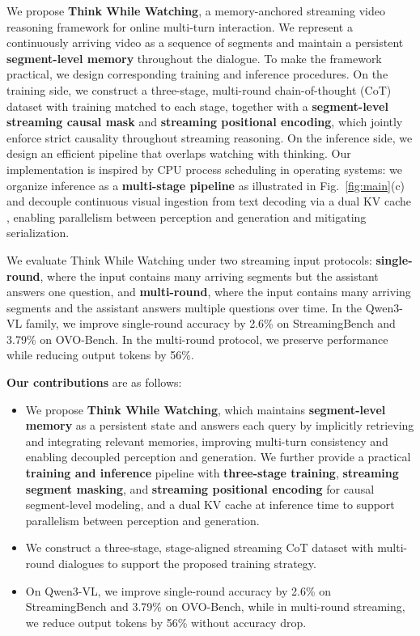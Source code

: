 \documentclass{article}
\begin{document}
We propose \textbf{Think While Watching}, a memory-anchored streaming video reasoning framework for online multi-turn interaction. We represent a continuously arriving video as a sequence of segments and maintain a persistent \textbf{segment-level memory} throughout the dialogue. To make the framework practical, we design corresponding training and inference procedures. On the training side, we construct a three-stage, multi-round chain-of-thought (CoT) dataset with training matched to each stage, together with a \textbf{segment-level streaming causal mask} and \textbf{streaming positional encoding}, which jointly enforce strict causality throughout streaming reasoning. On the inference side, we design an efficient pipeline that overlaps watching with thinking. Our implementation is inspired by CPU process scheduling \cite{DBLP:books/wi/SGG2018} in operating systems: we organize inference as a \textbf{multi-stage pipeline} as illustrated in Fig.~\ref{fig:main}(c) and decouple continuous visual ingestion from text decoding via a dual KV cache \cite{DBLP:conf/acl/TongFLFZSS25,DBLP:journals/corr/abs-2510-17238,lin2026speakwatchingunleashingtrue}, enabling parallelism between perception and generation and mitigating serialization.

We evaluate Think While Watching under two streaming input protocols: \textbf{single-round}, where the input contains many arriving segments but the assistant answers one question, and \textbf{multi-round}, where the input contains many arriving segments and the assistant answers multiple questions over time. In the Qwen3-VL family, we improve single-round accuracy by 2.6\% on StreamingBench and 3.79\% on OVO-Bench. In the multi-round protocol, we preserve performance while reducing output tokens by 56\%.

\noindent\textbf{Our contributions} are as follows:
\begin{itemize}
  \item We propose \textbf{Think While Watching}, which maintains \textbf{segment-level memory} as a persistent state and answers each query by implicitly retrieving and integrating relevant memories, improving multi-turn consistency and enabling decoupled perception and generation. We further provide a practical \textbf{training and inference} pipeline with \textbf{three-stage training}, \textbf{streaming segment masking}, and \textbf{streaming positional encoding} for causal segment-level modeling, and a dual KV cache at inference time to support parallelism between perception and generation.
  \item We construct a three-stage, stage-aligned streaming CoT dataset with multi-round dialogues to support the proposed training strategy.
  \item On Qwen3-VL, we improve single-round accuracy by 2.6\% on StreamingBench and 3.79\% on OVO-Bench, while in multi-round streaming, we reduce output tokens by 56\% without accuracy drop.
\end{itemize}
\end{document}
